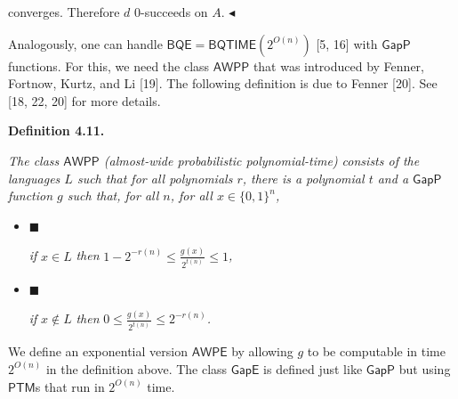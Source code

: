\documentclass[10pt,a4paper]{article}
\begin{document}
converges. Therefore $d$ $0$-succeeds on $A$.
$\blacktriangleleft$\par




Analogously, one can handle $\mathsf{BQE}=\mathsf{BQTIME}(2^{O(n)})$ [5, 16]
with $\mathsf{GapP}$ functions. For this, we need the class $\mathsf{AWPP}$ that was introduced by Fenner, Fortnow, Kurtz, and Li [19].
The following definition is due to Fenner [20]. See [18, 22, 20] for more details.\par





\par\medskip\noindent\textbf{
\textbf{Definition 4.11}\textbf{.}
}\par



\emph{The class $\mathsf{AWPP}$ (almost-wide probabilistic polynomial-time) consists of
the languages $L$ such that for all polynomials $r$, there is a polynomial $t$ and a $\mathsf{GapP}$
function $g$ such that, for all $n$, for all $x\in\{0,1\}^{n}$,}\par


\begin{itemize}


\item[] 
$\blacksquare$ 


\emph{if }$x\in L$\emph{ then }$1-2^{-r(n)}\leq\frac{g(x)}{2^{t(n)}}\leq 1$\emph{,}\par





\item[] 
$\blacksquare$ 


\emph{if }$x\not\in L$\emph{ then }$0\leq\frac{g(x)}{2^{t(n)}}\leq 2^{-r(n)}$\emph{.}\par





\end{itemize}






We define an exponential version $\mathsf{AWPE}$ by allowing $g$ to be computable in time $2^{O(n)}$ in the definition above. The class $\mathsf{GapE}$ is defined just like $\mathsf{GapP}$ but using $\mathsf{PTM}$s that run in $2^{O(n)}$ time.\par
\end{document}
